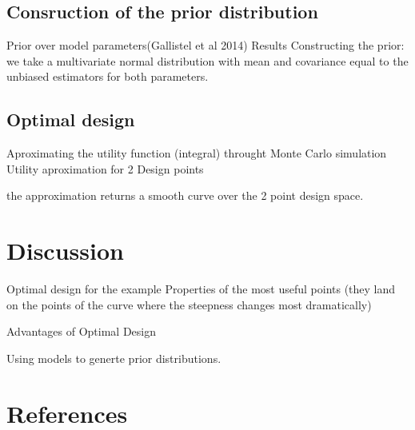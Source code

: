 \documentclass[preprint,review,12pt]{elsarticle}
\begin{document}
\subsection{Consruction of the prior distribution}

Prior over model parameters(Gallistel et al 2014)
Results
Constructing the prior: we take a multivariate normal distribution with mean and covariance equal to the unbiased estimators for both parameters.


\subsection{Optimal design}

Aproximating the utility function (integral) throught Monte Carlo simulation 
Utility aproximation for 2 Design points 

the approximation returns a smooth curve over the 2 point design space.

\section{Discussion}
\label{S:4}

Optimal design for the example
Properties of the most useful points (they land on the points of the curve where the steepness changes most dramatically)

Advantages of Optimal Design

Using models to generte prior distributions.





\section*{References}



\end{document}
